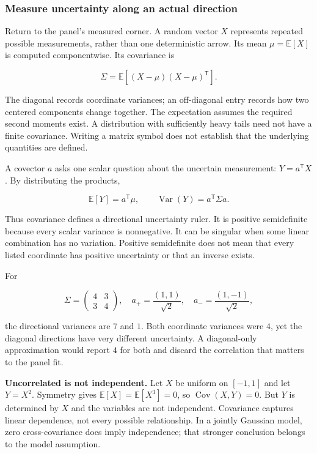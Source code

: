 \subsubsection{Measure uncertainty along an actual direction}\label{measure-uncertainty-along-an-actual-direction}

Return to the panel's measured corner. A random vector \(X\) represents repeated possible measurements, rather than one deterministic arrow. Its mean \(\mu=\mathbb E[X]\) is computed componentwise. Its covariance is

\[
\Sigma=\mathbb E[(X-\mu)(X-\mu)^{\mathsf T}].
\]

The diagonal records coordinate variances; an off-diagonal entry records how two centered components change together. The expectation assumes the required second moments exist. A distribution with sufficiently heavy tails need not have a finite covariance. Writing a matrix symbol does not establish that the underlying quantities are defined.

A covector \(a\) asks one scalar question about the uncertain measurement: \(Y=a^{\mathsf T}X\). By distributing the products,

\[
\mathbb E[Y]=a^{\mathsf T}\mu,\qquad
\operatorname{Var}(Y)=a^{\mathsf T}\Sigma a.
\]

Thus covariance defines a directional uncertainty ruler. It is positive semidefinite because every scalar variance is nonnegative. It can be singular when some linear combination has no variation. Positive semidefinite does not mean that every listed coordinate has positive uncertainty or that an inverse exists.

For

\[
\Sigma=\begin{pmatrix}4&3\\3&4\end{pmatrix},
\quad a_+=\frac{(1,1)}{\sqrt2},\quad
a_-=\frac{(1,-1)}{\sqrt2},
\]

the directional variances are \(7\) and \(1\). Both coordinate variances were \(4\), yet the diagonal directions have very different uncertainty. A diagonal-only approximation would report \(4\) for both and discard the correlation that matters to the panel fit.

\textbf{Uncorrelated is not independent.} Let \(X\) be uniform on \([-1,1]\) and let \(Y=X^2\). Symmetry gives \(\mathbb E[X]=\mathbb E[X^3]=0\), so \(\operatorname{Cov}(X,Y)=0\). But \(Y\) is determined by \(X\) and the variables are not independent. Covariance captures linear dependence, not every possible relationship. In a jointly Gaussian model, zero cross-covariance does imply independence; that stronger conclusion belongs to the model assumption.

